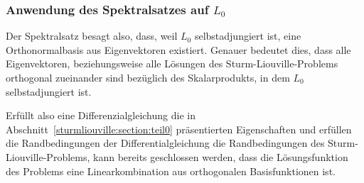\subsubsection{Anwendung des Spektralsatzes auf $L_0$}

Der Spektralsatz besagt also, dass, weil $L_0$ selbstadjungiert ist, eine
Orthonormalbasis aus Eigenvektoren existiert.
Genauer bedeutet dies, dass alle Eigenvektoren, beziehungsweise alle Lösungen
des Sturm-Liouville-Problems orthogonal zueinander sind bezüglich des
Skalarprodukts, in dem $L_0$ selbstadjungiert ist.

Erfüllt also eine Differenzialgleichung die in
Abschnitt~\ref{sturmliouville:section:teil0} präsentierten Eigenschaften und
erfüllen die Randbedingungen der Differentialgleichung die Randbedingungen
des Sturm-Liouville-Problems, kann bereits geschlossen werden, dass die
Lösungsfunktion des Problems eine Linearkombination aus orthogonalen
Basisfunktionen ist.

\fi

